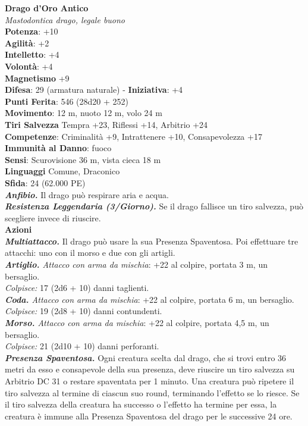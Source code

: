 \begin{multicols}{2}
\medskip\textbf{Drago d'Oro Antico}\\
\emph{Mastodontica drago, legale buono}\\
\textbf{Potenza}: +10\\
\textbf{Agilità}: +2\\
\textbf{Intelletto}: +4\\
\textbf{Volontà}: +4\\
\textbf{Magnetismo} +9\\
\textbf{Difesa}: 29 (armatura naturale) - \textbf{Iniziativa}: +4\\
\textbf{Punti Ferita}: 546 (28d20 + 252) \\
\textbf{Movimento}: 12 m, nuoto 12 m, volo 24 m\\
\textbf{Tiri Salvezza} Tempra +23, Riflessi +14, Arbitrio +24\\
\textbf{Competenze}: Criminalità +9, Intrattenere +10, Consapevolezza +17\\
\textbf{Immunità al Danno}: fuoco\\
\textbf{Sensi}: Scurovisione 36 m, vista cieca 18 m\\
\textbf{Linguaggi} Comune, Draconico\\
\textbf{Sfida}: 24 (62.000 PE)\smallskip\\
\emph{\textbf{Anfibio.}} Il drago può respirare aria e acqua.\\
\emph{\textbf{Resistenza Leggendaria (3/Giorno).}} Se il drago fallisce un tiro salvezza, può scegliere invece di riuscire.\\
\smallskip\textbf{Azioni}\\
\emph{\textbf{Multiattacco.}} Il drago può usare la sua Presenza Spaventosa. Poi effettuare tre attacchi: uno con il morso e due con gli artigli.\\
\emph{\textbf{Artiglio.} Attacco con arma da mischia}: +22 al colpire, portata 3 m, un bersaglio.\\
\emph{Colpisce:} 17 (2d6 + 10) danni taglienti.\\
\emph{\textbf{Coda.} Attacco con arma da mischia}: +22 al colpire, portata 6 m, un bersaglio.\\
\emph{Colpisce:} 19 (2d8 + 10) danni contundenti.\\
\emph{\textbf{Morso.} Attacco con arma da mischia}: +22 al colpire, portata 4,5 m, un bersaglio.\\
\emph{Colpisce:} 21 (2d10 + 10) danni perforanti.\\
\emph{\textbf{Presenza Spaventosa.}} Ogni creatura scelta dal drago, che si trovi entro 36 metri da esso e consapevole della sua presenza, deve riuscire un tiro salvezza su Arbitrio DC  31 o restare spaventata per 1 minuto. Una creatura può ripetere il tiro salvezza al termine di ciascun suo round, terminando l'effetto se lo riesce. Se il tiro salvezza della creatura ha successo o l'effetto ha termine per essa, la creatura è immune alla Presenza Spaventosa del drago per le successive 24 ore. \\

\end{multicols}
